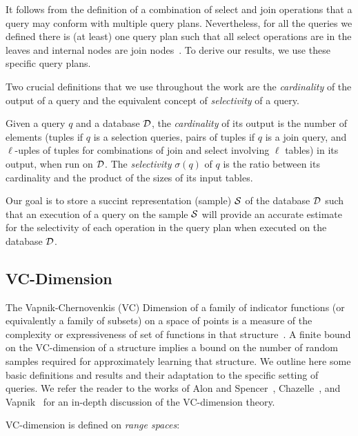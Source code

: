 It follows from the definition of a combination of select and join operations
that a query may conform with multiple query plans. Nevertheless, for all the
queries we defined there is (at least) one query plan such that all select
operations are in the leaves and internal nodes are join
nodes~\citep{GarciaMolinaUW02}. To derive our results, we use these specific
query plans.

Two crucial definitions that we use throughout the work are the 
\emph{cardinality} of the output of a query and the equivalent concept of
\emph{selectivity} of a query.

\begin{definition}\label{def:cardsel}
  Given a query $q$ and a database ${\cal D}$, the \emph{cardinality} of its output
  is the number of elements (tuples if $q$ is a selection queries, pairs of
  tuples if $q$ is a join query, and $\ell$-uples of tuples for combinations of
  join and select involving $\ell$ tables) in its output, when run on ${\cal D}$. The
  \emph{selectivity} $\sigma(q)$ of $q$ is the ratio between its cardinality and
  the product of the sizes of its input tables.
 \end{definition}

Our goal is to store a succint representation (sample) ${\cal S}$ of
the database ${\cal D}$ such that an execution of a query on the sample ${\cal S}$ will
provide an accurate estimate for the selectivity of
each operation in the query plan when executed on the database ${\cal D}$. 

\subsection{VC-Dimension}\label{sec:vcdim}
The Vapnik-Chernovenkis (VC) Dimension of a family of indicator functions (or
equivalently a family of subsets) on a space of points is a measure of
the complexity or expressiveness of  set of functions in that structure~\citep{VapnikC71}. A finite bound
on the VC-dimension of a structure implies a bound on the number of random
samples required for approximately learning that structure. We outline here some
basic definitions and results and their adaptation to the specific setting of
queries. We refer the reader to the works of Alon and
Spencer~\citeyearpar[Sect.~14.4]{AlonS08}, Chazelle~\citeyearpar[Chap.~4]{Chazelle00}, and
Vapnik~\citeyearpar{Vapnik99} for an in-depth discussion of the VC-dimension theory.

VC-dimension is defined on {\em range spaces}:

